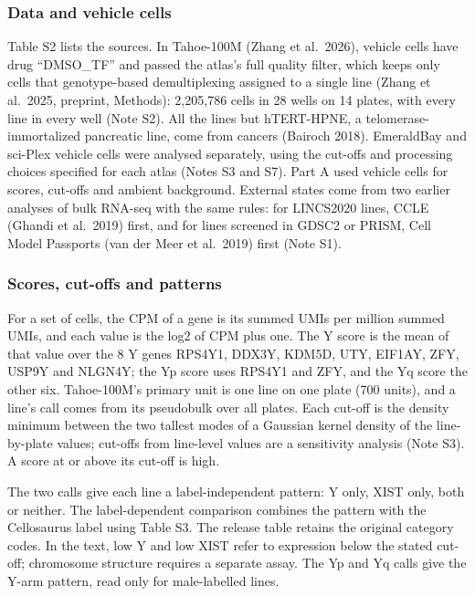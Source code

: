 \documentclass[
  11pt,
  letterpaper,
]{article}
\begin{document}
\subsubsection{Data and vehicle cells}\label{data-and-vehicle-cells}

Table S2 lists the sources. In Tahoe-100M (Zhang et al.~2026), vehicle
cells have drug ``DMSO\_TF'' and passed the atlas's full quality filter,
which keeps only cells that genotype-based demultiplexing assigned to a
single line (Zhang et al.~2025, preprint, Methods): 2,205,786 cells in
28 wells on 14 plates, with every line in every well (Note S2). All the
lines but hTERT-HPNE, a telomerase-immortalized pancreatic line, come
from cancers (Bairoch 2018). EmeraldBay and sci-Plex vehicle cells were
analysed separately, using the cut-offs and processing choices specified
for each atlas (Notes S3 and S7). Part A used vehicle cells for scores,
cut-offs and ambient background. External states come from two earlier
analyses of bulk RNA-seq with the same rules: for LINCS2020 lines, CCLE
(Ghandi et al.~2019) first, and for lines screened in GDSC2 or PRISM,
Cell Model Passports (van der Meer et al.~2019) first (Note S1).

\subsubsection{Scores, cut-offs and
patterns}\label{scores-cut-offs-and-patterns}

For a set of cells, the CPM of a gene is its summed UMIs per million
summed UMIs, and each value is the log2 of CPM plus one. The Y score is
the mean of that value over the 8 Y genes RPS4Y1, DDX3Y, KDM5D, UTY,
EIF1AY, ZFY, USP9Y and NLGN4Y; the Yp score uses RPS4Y1 and ZFY, and the
Yq score the other six. Tahoe-100M's primary unit is one line on one
plate (700 units), and a line's call comes from its pseudobulk over all
plates. Each cut-off is the density minimum between the two tallest
modes of a Gaussian kernel density of the line-by-plate values; cut-offs
from line-level values are a sensitivity analysis (Note S3). A score at
or above its cut-off is high.

The two calls give each line a label-independent pattern: Y only, XIST
only, both or neither. The label-dependent comparison combines the
pattern with the Cellosaurus label using Table S3. The release table
retains the original category codes. In the text, low Y and low XIST
refer to expression below the stated cut-off; chromosome structure
requires a separate assay. The Yp and Yq calls give the Y-arm pattern,
read only for male-labelled lines.
\end{document}

